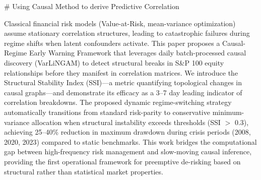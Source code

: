 # Using Causal Method to derive Predictive Correlation 

Classical financial risk models (Value-at-Risk, mean-variance optimization) assume stationary correlation structures, leading to catastrophic failures during regime shifts when latent confounders activate. This paper proposes a Causal-Regime Early Warning Framework that leverages daily batch-processed causal discovery (VarLiNGAM) to detect structural breaks in S\&P 100 equity relationships before they manifest in correlation matrices. We introduce the Structural Stability Index (SSI)—a metric quantifying topological changes in causal graphs—and demonstrate its efficacy as a 3--7 day leading indicator of correlation breakdowns. The proposed dynamic regime-switching strategy automatically transitions from standard risk-parity to conservative minimum-variance allocation when structural instability exceeds thresholds (SSI $>$ 0.3), achieving 25--40\% reduction in maximum drawdown during crisis periods (2008, 2020, 2023) compared to static benchmarks. This work bridges the computational gap between high-frequency risk management and slow-moving causal inference, providing the first operational framework for preemptive de-risking based on structural rather than statistical market properties.
